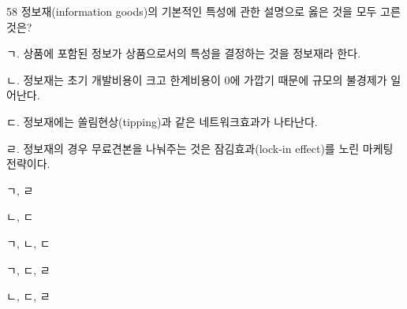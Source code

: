 \begin{question}{58}
정보재(information goods)의 기본적인 특성에 관한 설명으로 옳은 것을 모두 고른 것은?
\begin{framedtext}
ㄱ. 상품에 포함된 정보가 상품으로서의 특성을 결정하는 것을 정보재라 한다. \par
ㄴ. 정보재는 초기 개발비용이 크고 한계비용이 0에 가깝기 때문에 규모의 불경제가 일어난다. \par
ㄷ. 정보재에는 쏠림현상(tipping)과 같은 네트워크효과가 나타난다. \par
ㄹ. 정보재의 경우 무료견본을 나눠주는 것은 잠김효과(lock-in effect)를 노린 마케팅 전략이다. \par
\end{framedtext}
\begin{choices}
  \item ㄱ, ㄹ
  \item ㄴ, ㄷ
  \item ㄱ, ㄴ, ㄷ
  \item ㄱ, ㄷ, ㄹ
  \item ㄴ, ㄷ, ㄹ
\end{choices}
\end{question}
